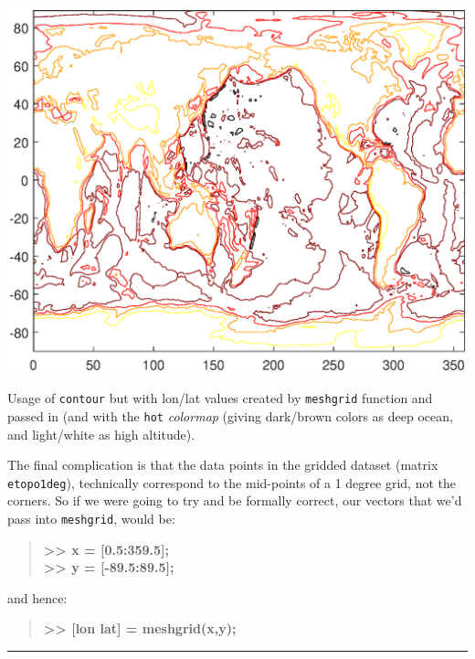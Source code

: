 \documentclass{tufte-book} %
\newenvironment{docspecbold}{\begin{quotation}\ttfamily\bfseries\parskip0pt\parindent0pt\ignorespaces}{\end{quotation}}
\begin{document}
\begin{marginfigure}[0.0in]
\includegraphics[width=\linewidth]{ch5-contour5.eps}
\caption{Usage of \texttt{contour} but with lon/lat values created by \texttt{meshgrid} function and passed in (and with the \texttt{hot} \textit{colormap} (giving dark/brown colors as deep ocean, and light/white as high altitude).}
\label{fig:ch5-contour5}
\end{marginfigure}

The final complication is that the data points in the gridded dataset (matrix \texttt{etopo1deg}), technically correspond to the mid-points of a 1 degree grid, not the corners. So if we were going to try and be formally correct, our vectors that we'd pass into \texttt{meshgrid}, would be:
\begin{docspecbold}
>> x = [0.5:359.5];
\\ >> y = [-89.5:89.5];
\end{docspecbold}
and hence:
\begin{docspecbold}
>> [lon lat] = meshgrid(x,y);
\end{docspecbold}



\vspace{1mm}
\noindent\rule{4cm}{0.5pt}
\vspace{-2mm}

%
\vspace{32mm}
\pagebreak 
\end{document}
